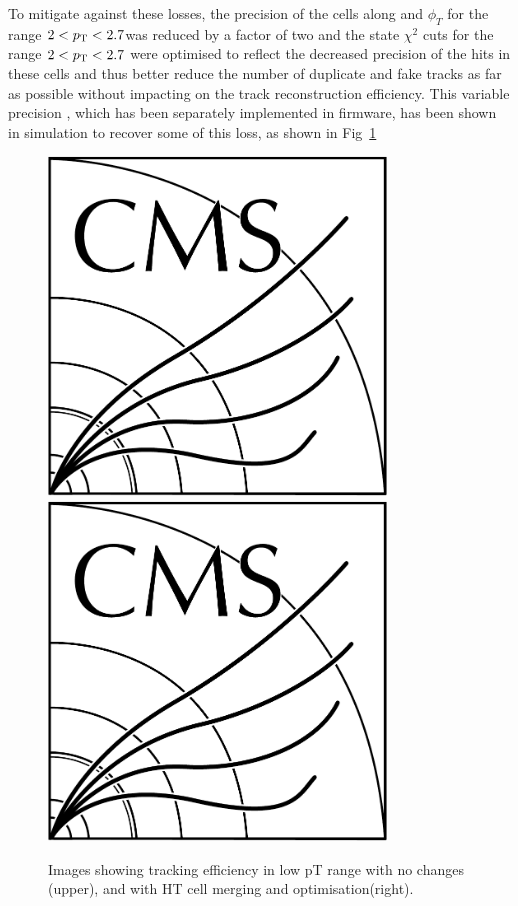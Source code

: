 To mitigate against these losses, the precision of the \HT cells along \qpt and $\phi_{T}$ for the range $2 < p_{\mathrm{T}} < 2.7$\GeVc was reduced by a factor of two and the \KF state $\chi^2$ cuts for the range $2 < p_{\mathrm{T}} < 2.7$ were optimised to reflect the decreased precision of the hits in these \HT cells and thus better reduce the number of duplicate and fake tracks as far as possible without impacting on the track reconstruction efficiency.
This variable precision \HT, which has been separately implemented in firmware, has been shown in simulation to recover some of this loss, as shown in Fig~\ref{fig:2GeVFlat}

\begin{figure}[tbp]
\centering
\includegraphics[width=0.8\textwidth,trim={1.1truecm 0truecm 1truecm 12truecm},clip]{CMS-bw-logo.pdf}
\includegraphics[width=0.8\textwidth,trim={0.7truecm 0truecm 1truecm 0truecm},clip]{CMS-bw-logo.pdf}
\caption{Images showing tracking efficiency in low pT range with no changes (upper), and with HT cell merging and \KF optimisation(right).}
\label{fig:2GeVFlat}
\end{figure}

